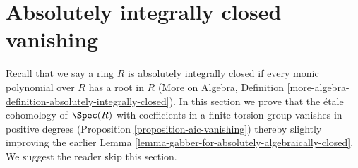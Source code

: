 \section{Absolutely integrally closed vanishing}
\label{section-aic-vanishing}

\noindent
Recall that we say a ring $R$ is absolutely integrally closed
if every monic polynomial over $R$ has a root in $R$
(More on Algebra, Definition
\ref{more-algebra-definition-absolutely-integrally-closed}).
In this section we prove that the \'etale cohomology of
$\Spec(R)$ with coefficients in a finite torsion group
vanishes in positive degrees (Proposition \ref{proposition-aic-vanishing})
thereby slightly improving the earlier
Lemma \ref{lemma-gabber-for-absolutely-algebraically-closed}.
We suggest the reader skip this section.

